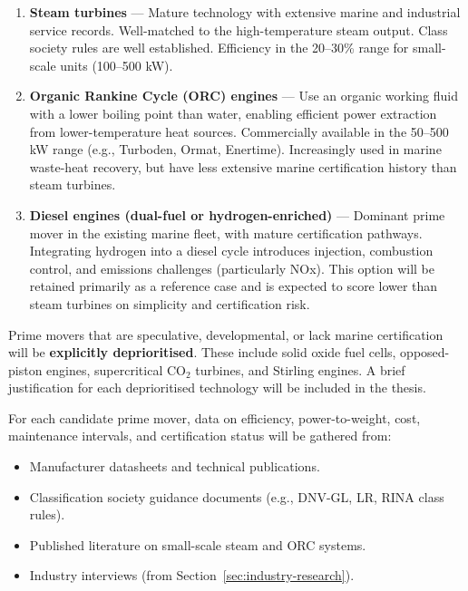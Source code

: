 \documentclass[12pt]{article}
\begin{document}
\begin{enumerate}[label=\arabic*.]
    \item \textbf{Steam turbines} — Mature technology with extensive marine and industrial service records. Well-matched to the high-temperature steam output. Class society rules are well established. Efficiency in the 20–30\% range for small-scale units (100–500 kW).
    
    \item \textbf{Organic Rankine Cycle (ORC) engines} — Use an organic working fluid with a lower boiling point than water, enabling efficient power extraction from lower-temperature heat sources. Commercially available in the 50–500 kW range (e.g., Turboden, Ormat, Enertime). Increasingly used in marine waste-heat recovery, but have less extensive marine certification history than steam turbines.
    
    \item \textbf{Diesel engines (dual-fuel or hydrogen-enriched)} — Dominant prime mover in the existing marine fleet, with mature certification pathways. Integrating hydrogen into a diesel cycle introduces injection, combustion control, and emissions challenges (particularly NOx). This option will be retained primarily as a reference case and is expected to score lower than steam turbines on simplicity and certification risk.
\end{enumerate}

Prime movers that are speculative, developmental, or lack marine certification will be \textbf{explicitly deprioritised}. These include solid oxide fuel cells, opposed-piston engines, supercritical CO$_2$ turbines, and Stirling engines. A brief justification for each deprioritised technology will be included in the thesis.

For each candidate prime mover, data on efficiency, power-to-weight, cost, maintenance intervals, and certification status will be gathered from:
\begin{itemize}
    \item Manufacturer datasheets and technical publications.
    \item Classification society guidance documents (e.g., DNV-GL, LR, RINA class rules).
    \item Published literature on small-scale steam and ORC systems.
    \item Industry interviews (from Section~\ref{sec:industry-research}).
\end{itemize}
\end{document}
